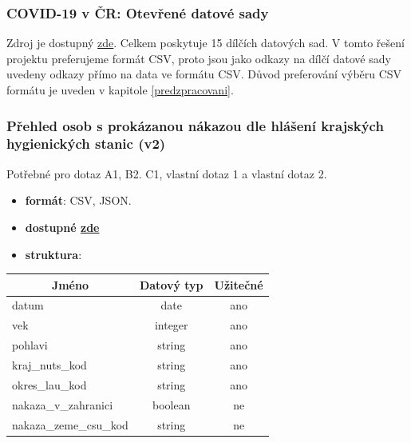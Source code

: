 \documentclass[12pt]{article}
\begin{document}
\subsubsection{COVID-19 v ČR: Otevřené datové sady}
\label{data1}
Zdroj je dostupný \href{https://onemocneni-aktualne.mzcr.cz/api/v2/covid-19}{zde}. Celkem poskytuje 15 dílčích datových sad. V tomto řešení projektu preferujeme formát CSV, proto jsou jako odkazy na dílčí datové sady uvedeny odkazy přímo na data ve formátu CSV. Důvod preferování výběru CSV formátu je uveden v kapitole \ref{predzpracovani}.


\subsubsection*{Přehled osob s prokázanou nákazou dle hlášení krajských hygienických stanic (v2)}
Potřebné pro dotaz A1, B2. C1, vlastní dotaz 1 a vlastní dotaz 2.
\begin{itemize}
    \item \textbf{formát}: CSV, JSON.
    \item \textbf{dostupné  \href{https://onemocneni-aktualne.mzcr.cz/api/v2/covid-19/osoby.csv}{zde}}
    \item \textbf{struktura}:
\end{itemize}
        \begin{center}
            \begin{tabular}{ |l|c|c| } 
                \hline
                \multicolumn{1}{|c|}{Jméno} & Datový typ & Užitečné \\
                \hline
                \hline
                datum & date & ano \\ 
                \hline
                vek & integer & ano \\ 
                \hline
                pohlavi & string & ano \\ 
                \hline
                kraj\_nuts\_kod & string & ano \\ 
                \hline
                okres\_lau\_kod & string & ano \\ 
                \hline
                nakaza\_v\_zahranici & boolean & ne \\ 
                \hline
                nakaza\_zeme\_csu\_kod & string & ne \\ 
                \hline
            \end{tabular}
        \end{center}
\end{document}
